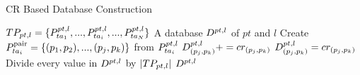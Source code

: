 \documentclass{ieeeaccess}
\begin{document}
\begin{algorithm}[t]
  \caption{CR Based Database Construction}
  \label{alg1}
  \begin{algorithmic}[1]
    \Require $TP_{pt, l} = \{P^{pt, l}_{ta_{1}}, ..., P^{pt, l}_{ta_{i}}, ..., P^{pt, l}_{ta_{N}}\}$ 
    \Ensure A database $D^{pt, l}$ of $pt$ and $l$ %
    \State Create $P^{\mathrm{pair}}_{ta_{i}} = \{(p_1, p_2), ..., (p_j, p_k)\}$ from $P^{pt, l}_{ta_{i}}$ 
      \Else
      \EndIf
        \State $D^{pt, l}_{(p_j, p_k)} += cr_{(p_j, p_k)}$ 
      \Else
        \State $D^{pt, l}_{(p_j, p_k)} = cr_{(p_j, p_k)}$ 
      \EndIf
    \EndFor 
  \EndFor 
  \State Divide every value in $D^{pt, l}$ by $|TP_{pt, l}|$
  \State \Return $D^{pt, l}$
  \end{algorithmic}
\end{algorithm} 
\end{document}
